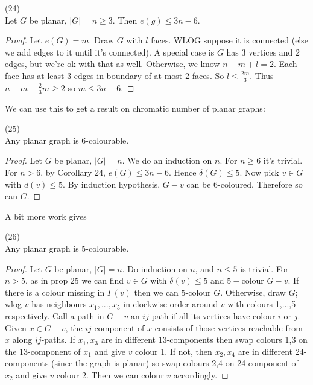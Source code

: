 \documentclass[a4paper]{article}
\begin{document}
\begin{coro} (24)\\
Let $G$ be planar, $|G| = n \geq 3$. Then $e(g) \leq 3n-6$.
\begin{proof}
Let $e(G) = m$. Draw $G$ with $l$ faces. WLOG suppose it is connected (else we add edges to it until it's connected). A special case is $G$ has 3 vertices and 2 edges, but we're ok with that as well. Otherwise, we know $n-m+l=2$. Each face has at least 3 edges in boundary of at most 2 faces. So $l \leq \frac{2m}{3}$. Thus $n-m+\frac{2}{3}m \geq 2$ so $m \leq 3n-6$.
\end{proof}
\end{coro}

We can use this to get a result on chromatic number of planar graphs:

\begin{prop} (25)\\
Any planar graph is $6$-colourable.
\begin{proof}
Let $G$ be planar, $|G| = n$. We do an induction on $n$. For $n\geq 6$ it's trivial. For $n>6$, by Corollary 24, $e(G) \leq 3n-6$. Hence $\delta(G)\leq 5$. Now pick $v\in G$ with $d(v) \leq 5$. By induction hypothesis, $G-v$ can be 6-coloured. Therefore so can $G$.
\end{proof}
\end{prop}

A bit more work gives 
\begin{thm} (26)\\
Any planar graph is $5$-colourable.
\begin{proof}
Let $G$ be planar, $|G| = n$. Do induction on $n$, and $n\leq 5$ is trivial. For $n>5$, as in prop 25 we can find $v \in G$ with $\delta(v) \leq 5$ and $5-$colour $G-v$. If there is a colour missing in $\Gamma(v)$ then we can $5$-colour $G$. Otherwise, draw $G$; wlog $v$ has neighbours $x_1,...,x_5$ in clockwise order around $v$ with colours 1,...,5 respectively. Call a path in $G-v$ an $ij$-path if all its vertices have colour $i$ or $j$. Given $x \in G-v$, the $ij$-component of $x$ consists of those vertices reachable from $x$ along $ij$-paths. If $x_1,x_3$ are in different 13-components then swap colours 1,3 on the 13-component of $x_1$ and give $v$ colour 1. If not, then $x_2,x_4$ are in different 24-components (since the graph is planar) so swap colours 2,4 on 24-component of $x_2$ and give $v$ colour 2. Then we can colour $v$ accordingly.
\end{proof}
\end{thm}
\end{document}
